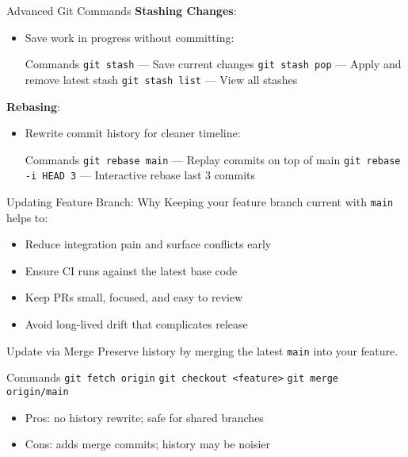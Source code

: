 \documentclass{beamer}
\begin{document}
\begin{frame}{Advanced Git Commands}
  \textbf{Stashing Changes}:
  \begin{itemize}
    \item Save work in progress without committing:
    \begin{block}{Commands}
      \texttt{git stash} --- Save current changes\newline
      \texttt{git stash pop} --- Apply and remove latest stash\newline
      \texttt{git stash list} --- View all stashes
    \end{block}
  \end{itemize}
  
  \textbf{Rebasing}:
  \begin{itemize}
    \item Rewrite commit history for cleaner timeline:
    \begin{block}{Commands}
      \texttt{git rebase main} --- Replay commits on top of main\newline
      \texttt{git rebase -i HEAD~3} --- Interactive rebase last 3 commits
    \end{block}
  \end{itemize}
\end{frame}

\begin{frame}{Updating Feature Branch: Why}
  \footnotesize
  Keeping your feature branch current with \texttt{main} helps to:
  \begin{itemize}
    \item Reduce integration pain and surface conflicts early
    \item Ensure CI runs against the latest base code
    \item Keep PRs small, focused, and easy to review
    \item Avoid long-lived drift that complicates release
  \end{itemize}
\end{frame}

\begin{frame}{Update via Merge}
  \footnotesize
  Preserve history by merging the latest \texttt{main} into your feature.
  \begin{block}{Commands}
    \texttt{git fetch origin}\newline
    \texttt{git checkout <feature>}\newline
    \texttt{git merge origin/main}
  \end{block}
  \begin{itemize}
    \item Pros: no history rewrite; safe for shared branches
    \item Cons: adds merge commits; history may be noisier
  \end{itemize}
\end{frame}
\end{document}
